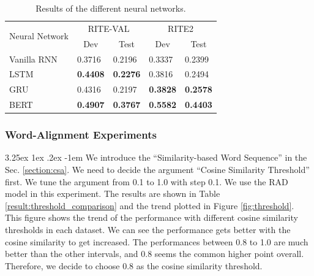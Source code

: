 \documentclass[12pt]{article}
\makeatletter
\renewcommand\paragraph{\@startsection{paragraph}{5}{\z@}%
  {3.25ex \@plus1ex \@minus.2ex}%
  {-1em}%
  {\normalfont\normalsize\bfseries}}
\makeatother
\begin{document}
\begin{CJK*}{UTF8}{bkai}
\begin{spacing}{1.77}
\begin{table}[H]
  \centering
  \setlength{\extrarowheight}{-3pt}
  \begin{tabular}{|l|l|l|l|l|}
  \hline
  \multirow{2}{*}{Neural Network} & \multicolumn{2}{c|}{RITE-VAL} & \multicolumn{2}{c|}{RITE2} \\ \cline{2-5}
   & \multicolumn{1}{c|}{Dev} & \multicolumn{1}{c|}{Test} & \multicolumn{1}{c|}{Dev} & \multicolumn{1}{c|}{Test} \\ \hline
  Vanilla RNN & 0.3716 & 0.2196 & 0.3337 & 0.2399 \\ \hline
  LSTM & \textbf{0.4408} & \textbf{0.2276} & 0.3816 & 0.2494 \\ \hline
  GRU & 0.4316 & 0.2197 & \textbf{0.3828} & \textbf{0.2578} \\ \hline
  BERT & \textbf{0.4907} & \textbf{0.3767} & \textbf{0.5582} & \textbf{0.4403} \\ \hline
  \end{tabular}
  \caption{Results of the different neural networks.}
  \label{result:rnn_types}
\end{table}

\subsubsection{Word-Alignment Experiments}
\paragraph{}
We introduce the ``Similarity-based Word Sequence'' in the Sec. \ref{section:csa}. We need to decide the argument ``Cosine Similarity Threshold'' first. We tune the argument from 0.1 to 1.0 with step 0.1. We use the RAD model in this experiment. The results are shown in Table \ref{result:threshold_comparison} and the trend plotted in Figure \ref{fig:threshold}. This figure shows the trend of the performance with different cosine similarity thresholds in each dataset. We can see the performance gets better with the cosine similarity to get increased. The performances between 0.8 to 1.0 are much better than the other intervals, and 0.8 seems the common higher point overall. Therefore, we decide to choose 0.8 as the cosine similarity threshold.


\end{spacing}
\end{CJK*}
\end{document}
